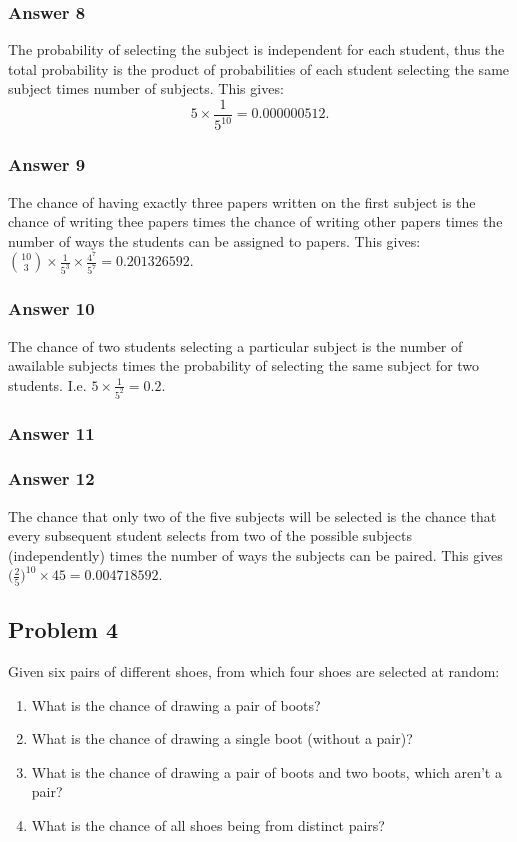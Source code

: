 \documentclass[11pt]{article}
\begin{document}
\subsubsection{Answer 8}
\label{sec-1-3-1}
The probability of selecting the subject is independent for each student,
thus the total probability is the product of probabilities of each student
selecting the same subject times number of subjects.  This gives:
\begin{equation*}
  5 \times \frac{1}{5^{10}} = \num{0.000000512}.
\end{equation*}
\subsubsection{Answer 9}
\label{sec-1-3-2}
The chance of having exactly three papers written on the first subject is
the chance of writing thee papers times the chance of writing other papers
times the number of ways the students can be assigned to papers.  This
gives:
$\binom{10}{3} \times \frac{1}{5^3} \times \frac{4^7}{5^7} = \num{0.201326592}$.
\subsubsection{Answer 10}
\label{sec-1-3-3}
The chance of two students selecting a particular subject is the number of
awailable subjects times the probability of selecting the same subject for
two students.  I.e. $5 \times \frac{1}{5^2} = 0.2$.
\subsubsection{Answer 11}
\label{sec-1-3-4}


\subsubsection{Answer 12}
\label{sec-1-3-5}
The chance that only two of the five subjects will be selected is the chance
that every subsequent student selects from two of the possible subjects
(independently) times the number of ways the subjects can be paired.  This
gives $\Big(\frac{2}{5}\Big)^{10} \times 45 = \num{0.004718592}$.
\subsection{Problem 4}
\label{sec-1-4}
Given six pairs of different shoes, from which four shoes are selected at
random:
\begin{enumerate}
\item What is the chance of drawing a pair of boots?
\item What is the chance of drawing a single boot (without a pair)?
\item What is the chance of drawing a pair of boots and two boots, which aren't
a pair?
\item What is the chance of all shoes being from distinct pairs?
\end{enumerate}
\end{document}
